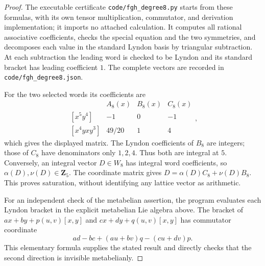 \begin{proof}
The executable certificate \texttt{code/fgh\_degree8.py} starts from
these formulas, with its own tensor multiplication, commutator, and
derivation implementation; it imports no attached calculation.
It computes all rational associative coefficients, checks the
special equation and the two symmetries, and decomposes each value
in the standard Lyndon basis by triangular subtraction. At each
subtraction the leading word is checked to be Lyndon and its
standard bracket has leading coefficient $1$. The complete vectors
are recorded in \texttt{code/fgh\_degree8.json}.

For the two selected words its coefficients are
\[
 \begin{array}{c|rrr}
 &A_8(x)&B_8(x)&C_8(x)\\\hline
 {[x^5y^4]}&-1&0&-1\\
 {[x^4yxy^3]}&49/20&1&4
 \end{array},
\]
which gives the displayed matrix. The Lyndon coefficients of $B_8$
are integers; those of $C_8$ have denominators only $1,2,4$.
Thus both are integral at $5$. Conversely, an integral vector
$D\in W_8$ has integral word coefficients, so
$\alpha(D),\nu(D)\in\mathbf Z_5$. The coordinate matrix gives
$D=\alpha(D)C_8+\nu(D)B_8$. This proves saturation, without
identifying any lattice vector as arithmetic.

For an independent check of the metabelian assertion, the program
evaluates each Lyndon bracket in the explicit metabelian Lie
algebra above. The bracket of
$ax+by+p(u,v)[x,y]$ and $cx+dy+q(u,v)[x,y]$ has commutator
coordinate
\[
 ad-bc+(au+bv)q-(cu+dv)p.
\]
This elementary formula supplies the stated result and directly
checks that the second direction is invisible metabelianly.
\end{proof}


